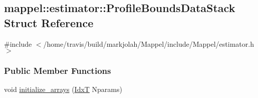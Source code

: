 \hypertarget{structmappel_1_1estimator_1_1ProfileBoundsDataStack}{}\subsection{mappel\+:\+:estimator\+:\+:Profile\+Bounds\+Data\+Stack Struct Reference}
\label{structmappel_1_1estimator_1_1ProfileBoundsDataStack}


{\ttfamily \#include $<$/home/travis/build/markjolah/\+Mappel/include/\+Mappel/estimator.\+h$>$}

\subsubsection*{Public Member Functions}
\begin{DoxyCompactItemize}
\item 
void \hyperlink{structmappel_1_1estimator_1_1ProfileBoundsDataStack_ac881f729f5b5e6be95f5755fa939fddc}{initialize\+\_\+arrays} (\hyperlink{namespacemappel_ab17ec0f30b61ece292439d7ece81d3a8}{IdxT} Nparams)
\end{DoxyCompactItemize}
